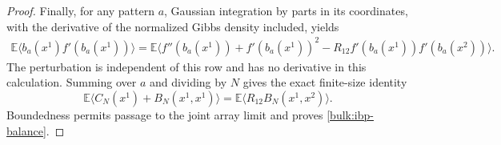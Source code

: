 \begin{proof}
Finally, for any pattern $a$, Gaussian integration by parts in its
coordinates, with the derivative of the normalized Gibbs density
included, yields
\begin{align*}
 \mathbb E\langle b_a(x^1)f'(b_a(x^1))\rangle
 =\mathbb E\big\langle
   f''(b_a(x^1))+f'(b_a(x^1))^2
   -R_{12}f'(b_a(x^1))f'(b_a(x^2))\big\rangle.
\end{align*}
The perturbation is independent of this row and has no derivative in
this calculation.  Summing over $a$ and dividing by $N$ gives the exact
finite-size identity
\[
 \mathbb E\langle C_N(x^1)+B_N(x^1,x^1)\rangle
   =\mathbb E\langle R_{12}B_N(x^1,x^2)\rangle.
\]
Boundedness permits passage to the joint array limit and proves
\eqref{bulk:ibp-balance}.
\end{proof}
